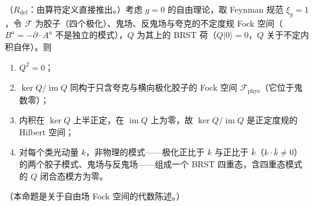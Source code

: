 \begin{proposition}\label{prop:qcd-brst-cohomology}
（$R_{\mathrm{def}}$：由算符定义直接推出。）考虑 $g=0$ 的自由理论，取 Feynman 规范 $\xi_g=1$，令 $\mathcal F$ 为胶子（四个极化）、鬼场、反鬼场与夸克的不定度规 Fock 空间（$B^a=-\partial\cdot A^a$ 不是独立的模式），$Q$ 为其上的 BRST 荷（$Q|0\rangle=0$，$Q$ 关于不定内积自伴）。则
\begin{enumerate}[label=(\alph*),leftmargin=2.2em,itemsep=1pt,topsep=2pt]
\item $Q^2=0$；
\item $\ker Q/\operatorname{im}Q$ 同构于只含夸克与横向极化胶子的 Fock 空间 $\mathcal F_{\mathrm{phys}}$（它位于鬼数零）；
\item 内积在 $\ker Q$ 上半正定，在 $\operatorname{im}Q$ 上为零，故 $\ker Q/\operatorname{im}Q$ 是正定度规的 Hilbert 空间；
\item 对每个类光动量 $k$，非物理的模式——极化正比于 $k$ 与正比于 $\bar k$（$k\cdot\bar k\neq0$）的两个胶子模式、鬼场与反鬼场——组成一个 BRST 四重态，含四重态模式的 $Q$ 闭合态模方为零。
\end{enumerate}
（本命题是关于自由场 Fock 空间的代数陈述。）
\end{proposition}

